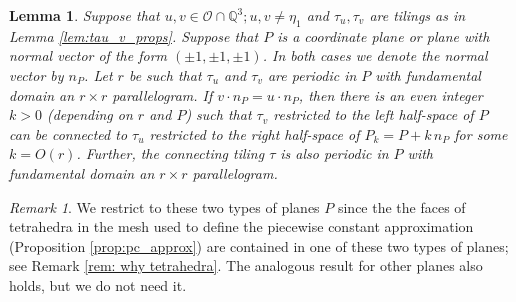 \documentclass[11pt]{article}
\newtheorem{lemma}[thm]{Lemma}
\theoremstyle{remark}
\newtheorem{rem}[thm]{Remark}
\theoremstyle{definition}
\begin{document}
\begin{lemma}\label{lem:gluing}
  Suppose that $u,v\in \mathcal{O} \cap \mathbb{Q}^3; u, v\neq \eta_1$ and $\tau_u, \tau_v$ are tilings as in Lemma \ref{lem:tau_v_props}. Suppose that $P$ is a coordinate plane or plane with normal vector of the form $(\pm 1, \pm 1, \pm 1)$. In both cases we denote the normal vector by $ n_P$. Let $r$ be such that  $\tau_u$ and $\tau_v$ are periodic in $P$ with fundamental domain an $r\times r$ parallelogram.
  If $ v\cdot n_P =  u \cdot  n_P$, then there is an even integer $k>0$ (depending on $r$ and $P$) such that $\tau_v$ restricted to the left half-space of $P$ can be connected to $\tau_u$ restricted to the right half-space of $P_k=P+k \,n_P$ for some $k=O(r)$. Further, the connecting tiling $\tau$ is also periodic in $P$ with fundamental domain an $r\times r$ parallelogram.
 
\end{lemma}
\begin{rem}
    We restrict to these two types of planes $P$ since the the faces of tetrahedra in the mesh used to define the piecewise constant approximation (Proposition \ref{prop:pc_approx}) are contained in one of these two types of planes; see Remark \ref{rem: why tetrahedra}. The analogous result for other planes also holds, but we do not need it. 
\end{rem}
\end{document}
